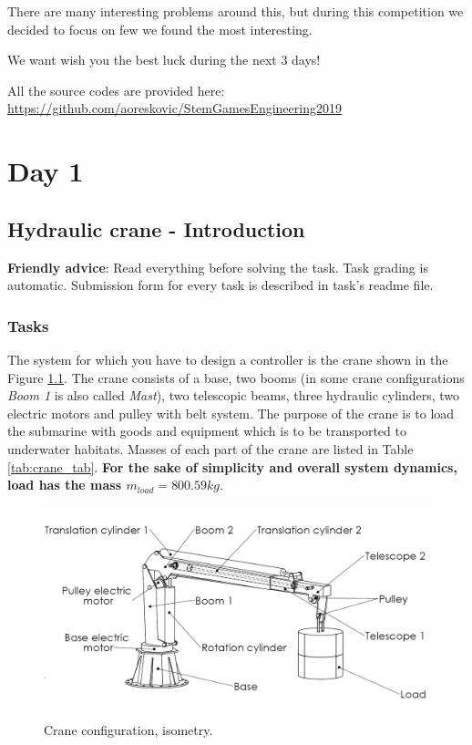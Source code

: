 \documentclass[openany]{book}
\begin{document}
	There are many interesting problems around this, but during this 
	competition we decided to focus on few we found the most interesting.
	
	We want wish you the best luck during the next 3 days!
	
	\vspace{2cm}
	
	All the source codes are provided here:\\
	\url{https://github.com/aoreskovic/StemGamesEngineering2019}
	
	
	\chapter{Day 1}
	\section{Hydraulic crane - Introduction}
	
	
	
	\noindent 
	\textbf{Friendly advice}: Read everything before solving the task. Task 
	grading is automatic. Submission form for every task is described in task's 
	readme file.
	
	\subsection{Tasks} \label{sec:tasks}
	
	The system for which you have to design a controller is the crane shown in 
	the Figure \ref{fig:isometry}. The crane consists of a base, two booms (in 
	some crane configurations \textit{Boom 1} is also called \textit{Mast}), 
	two telescopic beams, three hydraulic cylinders, two electric motors and 
	pulley with belt system. The purpose of the crane is to load the submarine 
	with goods and equipment which is to be transported to underwater habitats. 
	Masses of each part of the crane are listed in Table 
	\ref{tab:crane_tab}.\textbf{ For the sake of simplicity and overall system 
		dynamics, load has the mass $m_{load} = 800.59 kg$}.
	
	\begin{figure}[h!]
		\centering
		\includegraphics[width=\textwidth]{kran_teret_izometrija.jpg}
		\caption{Crane configuration, isometry.}
		\label{fig:isometry}
	\end{figure}
	
\end{document}
